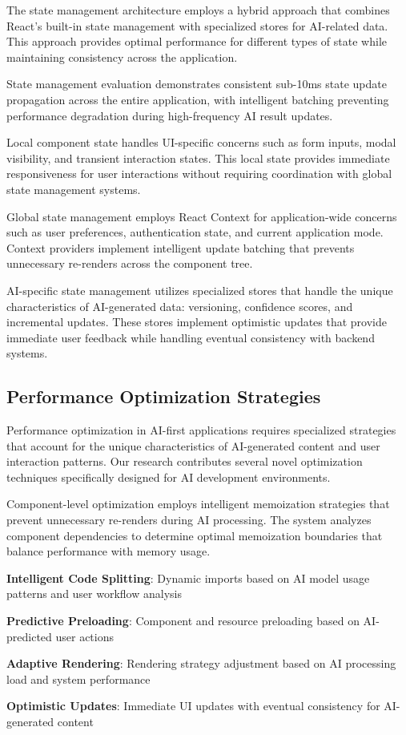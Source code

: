 The state management architecture employs a hybrid approach that combines React's built-in state management with specialized stores for AI-related data. This approach provides optimal performance for different types of state while maintaining consistency across the application.

\begin{successbox}
State management evaluation demonstrates consistent sub-10ms state update propagation across the entire application, with intelligent batching preventing performance degradation during high-frequency AI result updates.
\end{successbox}

Local component state handles UI-specific concerns such as form inputs, modal visibility, and transient interaction states. This local state provides immediate responsiveness for user interactions without requiring coordination with global state management systems.

Global state management employs React Context for application-wide concerns such as user preferences, authentication state, and current application mode. Context providers implement intelligent update batching that prevents unnecessary re-renders across the component tree.

AI-specific state management utilizes specialized stores that handle the unique characteristics of AI-generated data: versioning, confidence scores, and incremental updates. These stores implement optimistic updates that provide immediate user feedback while handling eventual consistency with backend systems.

\subsection*{Performance Optimization Strategies}

Performance optimization in AI-first applications requires specialized strategies that account for the unique characteristics of AI-generated content and user interaction patterns. Our research contributes several novel optimization techniques specifically designed for AI development environments.

Component-level optimization employs intelligent memoization strategies that prevent unnecessary re-renders during AI processing. The system analyzes component dependencies to determine optimal memoization boundaries that balance performance with memory usage.

\begin{expandedlist}
    \item \textbf{Intelligent Code Splitting}: Dynamic imports based on AI model usage patterns and user workflow analysis
    \item \textbf{Predictive Preloading}: Component and resource preloading based on AI-predicted user actions
    \item \textbf{Adaptive Rendering}: Rendering strategy adjustment based on AI processing load and system performance
    \item \textbf{Optimistic Updates}: Immediate UI updates with eventual consistency for AI-generated content
\end{expandedlist}

